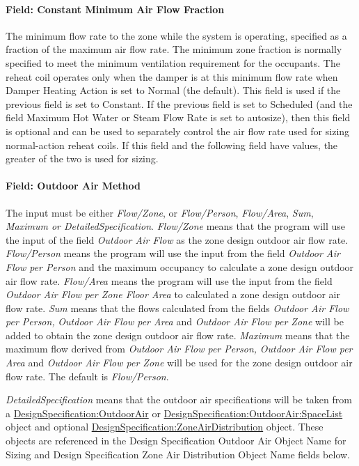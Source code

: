 \paragraph{Field: Constant Minimum Air Flow Fraction}\label{field-constant-minimum-air-flow-fraction-1-000}

The minimum flow rate to the zone while the system is operating, specified as a fraction of the maximum air flow rate. The minimum zone fraction is normally specified to meet the minimum ventilation requirement for the occupants. The reheat coil operates only when the damper is at this minimum flow rate when Damper Heating Action is set to Normal (the default). This field is used if the previous field is set to Constant. If the previous field is set to Scheduled (and the field Maximum Hot Water or Steam Flow Rate is set to autosize), then this field is optional and can be used to separately control the air flow rate used for sizing normal-action reheat coils. If this field and the following field have values, the greater of the two is used for sizing.

\paragraph{Field: Outdoor Air Method}\label{field-outdoor-air-method-10}

The input must be either \emph{Flow/Zone}, or \emph{Flow/Person}, \emph{Flow/Area}, \emph{Sum}, \emph{Maximum or DetailedSpecification}. \emph{Flow/Zone} means that the program will use the input of the field \emph{Outdoor Air Flow} as the zone design outdoor air flow rate. \emph{Flow/Person} means the program will use the input from the field \emph{Outdoor Air Flow per Person} and the maximum occupancy to calculate a zone design outdoor air flow rate. \emph{Flow/Area} means the program will use the input from the field \emph{Outdoor Air Flow per Zone Floor Area} to calculated a zone design outdoor air flow rate. \emph{Sum} means that the flows calculated from the fields \emph{Outdoor Air Flow per Person,} \emph{Outdoor Air Flow per Area} and \emph{Outdoor Air Flow per Zone} will be added to obtain the zone design outdoor air flow rate. \emph{Maximum} means that the maximum flow derived from \emph{Outdoor Air Flow per Person,} \emph{Outdoor Air Flow per Area} and \emph{Outdoor Air Flow per Zone} will be used for the zone design outdoor air flow rate. The default is \emph{Flow/Person}.

\emph{DetailedSpecification} means that the outdoor air specifications will be taken from a \hyperref[designspecificationoutdoorair]{DesignSpecification:OutdoorAir} or \hyperref[designspecificationoutdoorairspacelist]{DesignSpecification:OutdoorAir:SpaceList} object and optional \hyperref[designspecificationzoneairdistribution]{DesignSpecification:ZoneAirDistribution} object. These objects are referenced in the Design Specification Outdoor Air Object Name for Sizing and Design Specification Zone Air Distribution Object Name fields below.

